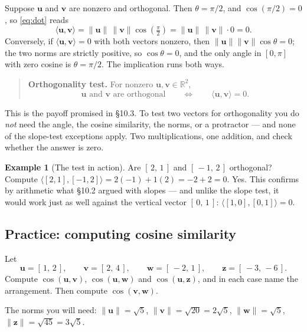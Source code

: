 \documentclass[11pt]{article}
\theoremstyle{definition}
\newtheorem{ex}{Example}
\theoremstyle{remark}
\newcommand{\R}{\mathbb{R}}
\newcommand{\vc}[1]{\mathbf{#1}}
\newcommand{\norm}[1]{\lVert #1\rVert}
\begin{document}
Suppose $\vc{u}$ and $\vc{v}$ are nonzero and orthogonal. Then $\theta=\pi/2$,
and $\cos(\pi/2)=0$, so \eqref{eq:dot} reads
\[
  \langle \vc{u},\vc{v}\rangle
  = \norm{\vc{u}}\,\norm{\vc{v}}\cos\!\left(\tfrac{\pi}{2}\right)
  = \norm{\vc{u}}\,\norm{\vc{v}}\cdot 0
  = 0 .
\]
Conversely, if $\langle\vc{u},\vc{v}\rangle=0$ with both vectors nonzero, then
$\norm{\vc{u}}\norm{\vc{v}}\cos\theta=0$; the two norms are strictly positive,
so $\cos\theta=0$, and the only angle in $[0,\pi]$ with zero cosine is
$\theta=\pi/2$. The implication runs both ways.

\begin{quote}
\textbf{Orthogonality test.} For nonzero $\vc{u},\vc{v}\in\R^{2}$,
\[
  \vc{u} \text{ and } \vc{v} \text{ are orthogonal}
  \qquad\Longleftrightarrow\qquad
  \langle \vc{u},\vc{v}\rangle = 0 .
\]
\end{quote}

\noindent This is the payoff promised in \S10.3. To test two vectors for
orthogonality you do \emph{not} need the angle, the cosine similarity, the
norms, or a protractor --- and none of the slope-test exceptions apply. Two
multiplications, one addition, and check whether the answer is zero.

\begin{ex}[The test in action]
Are $[\,2,\,1\,]$ and $[\,-1,\,2\,]$ orthogonal? Compute
$\langle[2,1],[-1,2]\rangle = 2(-1)+1(2) = -2+2 = 0$. Yes. This confirms by
arithmetic what \S10.2 argued with slopes --- and unlike the slope test, it
would work just as well against the vertical vector $[\,0,\,1\,]$:
$\langle[1,0],[0,1]\rangle = 0$.
\end{ex}

\subsection{Practice: computing cosine similarity}
Let
\[
  \vc{u}=[\,1,\,2\,],
  \qquad
  \vc{v}=[\,2,\,4\,],
  \qquad
  \vc{w}=[\,-2,\,1\,],
  \qquad
  \vc{z}=[\,-3,\,-6\,].
\]
Compute $\cos(\vc{u},\vc{v})$, $\cos(\vc{u},\vc{w})$ and $\cos(\vc{u},\vc{z})$,
and in each case name the arrangement. Then compute $\cos(\vc{v},\vc{w})$.

\medskip
\noindent The norms you will need:
$\norm{\vc{u}}=\sqrt5$, $\norm{\vc{v}}=\sqrt{20}=2\sqrt5$,
$\norm{\vc{w}}=\sqrt5$, $\norm{\vc{z}}=\sqrt{45}=3\sqrt5$.
\end{document}
